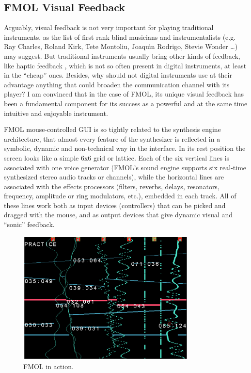 \subsection{FMOL Visual Feedback}

Arguably, visual feedback is not very important  for playing traditional 
instruments,  as   the   list   of   first   rank   blind musicians and
instrumentalists (e.g. Ray Charles, Roland Kirk, Tete Montoliu, Joaqu\'{\i}n
Rodrigo, Stevie Wonder \ldots{}) may suggest. But traditional instruments usually
bring  other kinds of feedback, like haptic  feedback \cite{Bongers:1994,Gillespie:1999}, which is 
not  so often  present  in  digital  instruments, at  least  in  the  ``cheap''
ones. Besides, why should not digital  instruments  use at their advantage
anything that could broaden the communication channel with its player? I am
convinced that in the case of FMOL, its unique visual feedback has been a
fundamental component for its success as a powerful and at the same time
intuitive and enjoyable instrument.

FMOL mouse-controlled GUI is so tightly related to the synthesis engine 
architecture, that almost every feature of the synthesizer is reflected in a symbolic, dynamic and non-technical way in the interface. In  its  rest position  the  screen looks like a simple 6x6 grid or lattice. Each of the six vertical lines is associated with  one  voice  generator (FMOL's sound engine supports six real-time synthesized stereo audio tracks or channels), while the horizontal lines are associated  with the effects processors
(filters, reverbs, delays, resonators, frequency, amplitude  or ring  modulators,
 etc.), embedded  in each track. All of these lines work both as input devices
(controllers) that can be picked and dragged with  the  mouse, and as output
devices that give dynamic visual and ``sonic'' feedback.

\begin{figure}[t]
\centering
\includegraphics[width=9cm]{jorda-fig2.png}
\caption{FMOL in action.}
\label{Jorda:fig:fmol} 
\end{figure}

